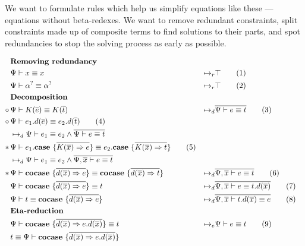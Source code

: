 \documentclass[twoside,12pt,a4paper]{article}
\begin{document}
We want to formulate rules which help us simplify equations like these --- equations without beta-redexes.
We want to remove redundant constraints, split constraints made up of composite terms to find solutions to their parts,
and spot redundancies to stop the solving process as early as possible.
\begin{definition}
    \begin{align*}
    &\textbf{Removing redundancy}\\
    &\Psi \vdash x\equiv x&\mapsto_r&\top
    \tag{1}\label{1}\\
    &\Psi \vdash \alphaunifvar \equiv \alphaunifvar&\mapsto_r& \top
    \tag{2}\\
    &\textbf{Decomposition}\\
    \circ\,&\Psi\vdash K(\overline{e})\equiv K(\overline{t})&
    \mapsto_d&\overline{\Psi\vdash e\equiv t}
    \tag{3}\label{3}\\
    \circ\,&\Psi \vdash e_1.d({\overline{e}})\equiv e_2.d({\overline{t}})\tag{4}\label{4}
    \\ &\mapsto_d \Psi\vdash e_1 \equiv e_2 \wedge \overline{\Psi\vdash e\equiv t}\\
    *\,&\Psi \vdash e_1.\expatmatch{\overline{K(\overline{x})\Rightarrow e}}\equiv e_2.\expatmatch{\overline{K(\overline{x})\Rightarrow t}}\tag{5}\label{5}
    \\ &\mapsto_d \Psi \vdash e_1 \equiv e_2\wedge \overline{\Psi, \overline{x}\vdash e\equiv t}\\
    *\, &\Psi\vdash \excopatmatch{\overline{d(\overline{x})\Rightarrow e}}\equiv 
    \excopatmatch{\overline{d(\overline{x})\Rightarrow t}}
    &\mapsto_d& \overline{\Psi, \overline{x}\vdash e \equiv t}
    \tag{6}\label{6}\\
    &\Psi\vdash \excopatmatch{\overline{d(\overline{x})\Rightarrow e}}\equiv t 
    &\mapsto_d& \overline{\Psi,\overline{x} \vdash e \equiv t.d(\overline{x})}
    \tag{7}\label{7}\\ 
    &\Psi\vdash t\equiv \excopatmatch{\overline{d(\overline{x})\Rightarrow e}} 
    &\mapsto_d& \overline{\Psi, \overline{x}\vdash t.d(\overline{x}) \equiv e}
    \tag{8}\label{8}\\
    &\textbf{Eta-reduction}\\
    & \Psi \vdash \excopatmatch{\overline{d(\overline{x})\Rightarrow e.d(\overline{x})}}\equiv t
    &\mapsto_e&\Psi\vdash e\equiv t
    \tag{9}\label{constraints_eta}\\
    & t \equiv  \Psi \vdash \excopatmatch{\overline{d(\overline{x})\Rightarrow e.d(\overline{x})}}

\end{align*}
\end{definition}
\end{document}
